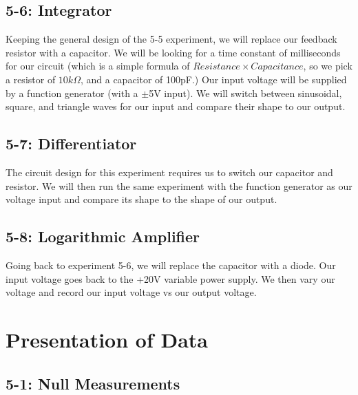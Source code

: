 \documentclass[%
 aip,
 jmp,
 amsmath,
 amssymb,
 reprint,%
 numerical,
 longbibliography,
]{revtex4-1}
\begin{document}
	\subsection{5-6: Integrator}
	
	Keeping the general design of the 5-5 experiment, we will replace our feedback resistor with a capacitor. We will be looking for a time constant of milliseconds
	for our circuit (which is a simple formula of $Resistance \times Capacitance$, so we pick a resistor of $10k\Omega$, and a capacitor of 100pF.) Our input
	voltage will be supplied by a function generator (with a $\pm$5V input). We will switch between sinusoidal, square, and triangle waves for our input and
	compare their shape to our output.
	
	\subsection{5-7: Differentiator}
	
	The circuit design for this experiment requires us to switch our capacitor and resistor. We will then run the same experiment with the function generator
	as our voltage input and compare its shape to the shape of our output.
	
	\subsection{5-8: Logarithmic Amplifier}
	
	Going back to experiment 5-6, we will replace the capacitor with a diode. Our input voltage goes back to the +20V variable power supply.
	We then vary our voltage and record our input voltage vs our output voltage.



\section{Presentation of Data}

	\subsection{5-1: Null Measurements}
	
\end{document}
